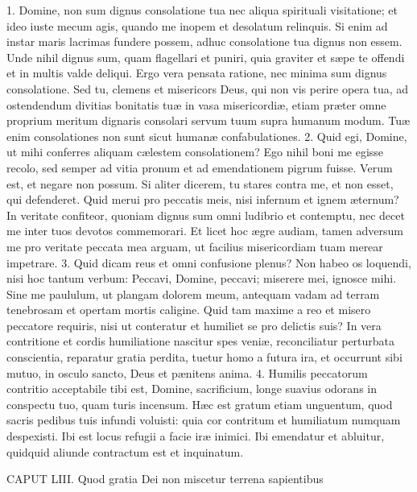 1. Domine, non sum dignus consolatione tua nec aliqua spirituali visitatione; et ideo iuste mecum agis, quando me inopem et desolatum relinquis. Si enim ad instar maris lacrimas fundere possem, adhuc consolatione tua dignus non essem. Unde nihil dignus sum, quam flagellari et puniri, quia graviter et sæpe te offendi et in multis valde deliqui. Ergo vera pensata ratione, nec minima sum dignus consolatione. Sed tu, clemens et misericors Deus, qui non vis perire opera tua, ad ostendendum divitias bonitatis tuæ in vasa misericordiæ, etiam præter omne proprium meritum dignaris consolari servum tuum supra humanum modum. Tuæ enim consolationes non sunt sicut humanæ confabulationes.
2. Quid egi, Domine, ut mihi conferres aliquam cælestem consolationem? Ego nihil boni me egisse recolo, sed semper ad vitia pronum et ad emendationem pigrum fuisse. Verum est, et negare non possum. Si aliter dicerem, tu stares contra me, et non esset, qui defenderet. Quid merui pro peccatis meis, nisi infernum et ignem æternum? In veritate confiteor, quoniam dignus sum omni ludibrio et contemptu, nec decet me inter tuos devotos commemorari. Et licet hoc ægre audiam, tamen adversum me pro veritate peccata mea arguam, ut facilius misericordiam tuam merear impetrare.
3. Quid dicam reus et omni confusione plenus? Non habeo os loquendi, nisi hoc tantum verbum: Peccavi, Domine, peccavi; miserere mei, ignosce mihi. Sine me paululum, ut plangam dolorem meum, antequam vadam ad terram tenebrosam et opertam mortis caligine. Quid tam maxime a reo et misero peccatore requiris, nisi ut conteratur et humiliet se pro delictis suis? In vera contritione et cordis humiliatione nascitur spes veniæ, reconciliatur perturbata conscientia, reparatur gratia perdita, tuetur homo a futura ira, et occurrunt sibi mutuo, in osculo sancto, Deus et pænitens anima.
4. Humilis peccatorum contritio acceptabile tibi est, Domine, sacrificium, longe suavius odorans in conspectu tuo, quam turis incensum. Hæc est gratum etiam unguentum, quod sacris pedibus tuis infundi voluisti: quia cor contritum et humiliatum numquam despexisti. Ibi est locus refugii a facie iræ inimici. Ibi emendatur et abluitur, quidquid aliunde contractum est et inquinatum.


CAPUT LIII.
Quod gratia Dei non miscetur terrena sapientibus


